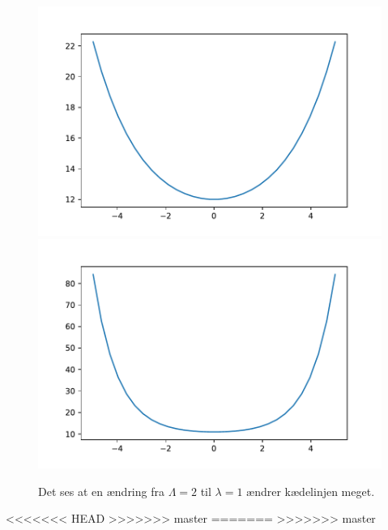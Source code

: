 \begin{figure}[h!]
\includegraphics[scale=0.5]{code/fig3}
\includegraphics[scale=0.5]{code/fig4}
\caption{Det ses at en ændring fra $\Lambda=2$ til $\lambda=1$ ændrer kædelinjen meget.}
\end{figure}

<<<<<<< HEAD
>>>>>>> master
=======
>>>>>>> master
